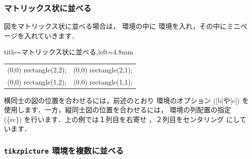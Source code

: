\documentclass[../geometrymemo.tex]{subfiles}
\begin{document}
\subsubsection{マトリックス状に並べる}

図をマトリックス状に並べる場合は， 環境の中に  環境を入れ，その中にミニページを入れていきます．
\begin{tcblisting}{title=マトリックス状に並べる,left=4.8mm}
    \begin{tabular}{rc}
        \begin{minipage}[b]{2cm} \centering
            \tikz \draw (0,0) rectangle(2,2); %
        \end{minipage}
         &
        \begin{minipage}[b]{2cm} \centering
            \tikz \draw (0,0) rectangle(2,1); %
        \end{minipage}
        \\
        \begin{minipage}[c]{1cm} \centering
            \tikz \draw (0,0) rectangle(1,2); %
        \end{minipage}
         &
        \begin{minipage}[c]{1cm} \centering
            \tikz \draw (0,0) rectangle(1,1); %
        \end{minipage}
    \end{tabular}
\end{tcblisting}
横同士の図の位置を合わせるには，前述のとおり  環境のオプション ([b]や[c]) を使用します．一方，縦同士図の位置を合わせるには， 環境の列配置の指定 (\{rc\}) を行います．上の例では１列目を右寄せ ，２列目をセンタリング  にしています．

\subsubsection{\texttt{tikzpicture} 環境を複数に並べる}
\end{document}
